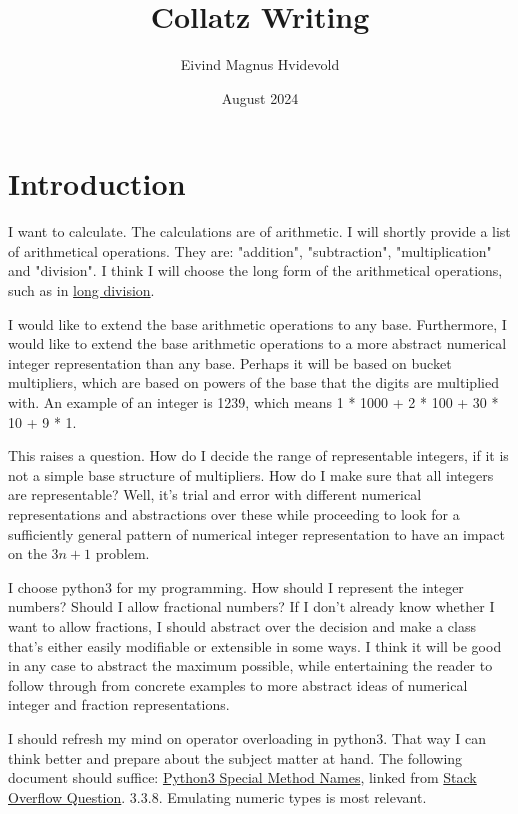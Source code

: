 \documentclass[10pt]{extarticle}
\title{Collatz Writing}
\author{Eivind Magnus Hvidevold}
\date{August 2024}
\begin{document}
\maketitle

\section{Introduction}

I want to calculate. The calculations are of arithmetic. I will shortly provide a list of arithmetical operations.
They are: "addition", "subtraction", "multiplication" and "division". I think I will choose the long form of the arithmetical operations, such as in \href{https://en.wikipedia.org/wiki/Long_division}{long division}.

I would like to extend the base arithmetic operations to any base. Furthermore, I would like to extend the base arithmetic operations to a more abstract numerical integer representation than any base. Perhaps it will be based on bucket multipliers, which are based on powers of the base that the digits are multiplied with.  An example of an integer is 1239, which means 1 * 1000 + 2 * 100 + 30 * 10 + 9 * 1.

This raises a question. How do I decide the range of representable integers, if it is not a simple base structure of multipliers. How do I make sure that all integers are representable? Well, it's trial and error with different numerical representations and abstractions over these while proceeding to look for a sufficiently general pattern of numerical integer representation to have an impact on the $3n + 1$ problem.

I choose python3 for my programming. How should I represent the integer numbers? Should I allow fractional numbers? If I don't already know whether I want to allow fractions, I should abstract over the decision and make a class that's either easily modifiable or extensible in some ways. I think it will be good in any case to abstract the maximum possible, while entertaining the reader to follow through from concrete examples to more abstract ideas of numerical integer and fraction representations.

I should refresh my mind on operator overloading in python3. That way I can think better and prepare about the subject matter at hand. The following document should suffice: \href{https://docs.python.org/3/reference/datamodel.html#special-method-names}{Python3 Special Method Names},
linked from \href{https://stackoverflow.com/questions/2400635/comprehensive-guide-to-operator-overloading-in-python}{Stack Overflow Question}. 3.3.8. Emulating numeric types is most relevant.
\end{document}
